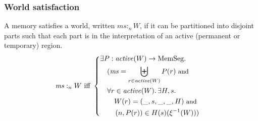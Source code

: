 \documentclass[compsoc,conference,letterpaper,fleqn]{IEEEtran}
\DeclareMathOperator{\dom}{dom}
\newcommand{\var}[1]{\mathit{#1}}
\newcommand{\hs}{\var{ms}}
\newcommand{\ms}{\hs}
\newcommand{\heap}{\var{mem}}
\newcommand{\plainfun}[2]{
  \ifthenelse{\equal{#2}{}}
  {\mathit{#1}}
  {\mathit{#1}(#2)}
}
\newcommand{\activeReg}[1]{\plainfun{active}{#1}}
\newcommand{\futurewk}{\mathbin{\sqsupseteq}^{\var{pub}}}
\newcommand{\futurestr}{\mathbin{\sqsupseteq}^{\var{priv}}}
\newcommand{\heapSat}[3][\heap]{#1 :_{#2} #3}
\newcommand{\memSat}[3][n]{\heapSat[#2]{#1}{#3}}
\newcommand{\plaindom}[1]{\mathrm{#1}}
\newcommand{\HeapSegments}{\plaindom{MemSeg}}
\newcommand{\npair}[2][n]{\left(#1,#2 \right)}
\begin{document}




\subsubsection{World satisfaction}
A memory satisfies a world, written $\memSat{\ms}{W}$, 
if it can be partitioned into disjoint parts such that each part is
in the interpretation of an active (permanent or temporary) region. 
\begin{align*}
  &\memSat{\ms}{W}
    \text{ iff }
    \left\{\begin{aligned}
        &\exists P : \activeReg{W} \rightarrow \HeapSegments \ldotp \\
        &\quad (\hs = \biguplus_{r\in\activeReg{W}}P(r) \text{\footnotesize{ and }} \\
        &\quad \forall r \in \activeReg{W} \ldotp \exists H,s \ldotp\\
        &\qquad W(r) = (\_,s,\_,\_,H) \text{\footnotesize{ and }} \\
        &\qquad \npair[n]{P(r)} \in H(s)(\xi^{-1}(W)))\\
      \end{aligned}\right.
\end{align*}
\end{document}
